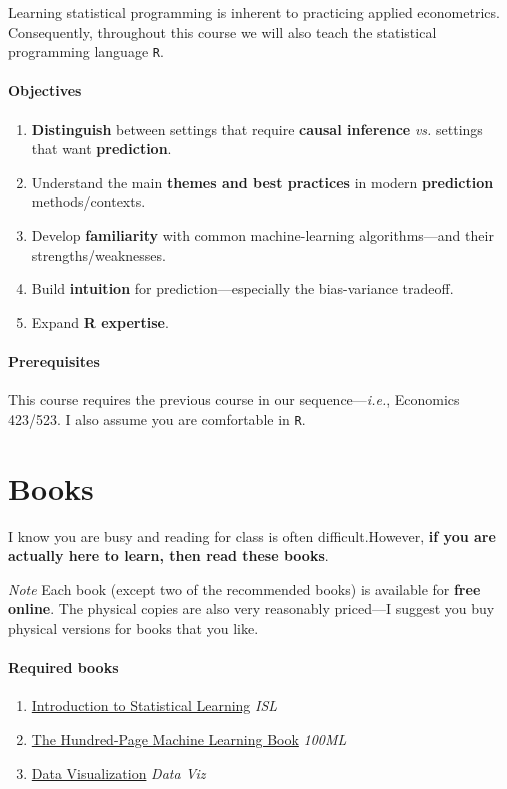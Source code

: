 \documentclass[10pt]{article}
\newcommand{\emf}[1]{\textbf{\textcolor{grass_green}{#1}}}
\begin{document}
Learning statistical programming is inherent to practicing applied econometrics. Consequently, throughout this course we will also teach the statistical programming language \texttt{R}.

\paragraph{Objectives}

\begin{enumerate}
  \item \emf{Distinguish} between settings that require \emf{causal inference} \textit{vs.} settings that want \emf{prediction}.
  \item Understand the main \emf{themes and best practices} in modern \emf{prediction} methods/contexts.
  \item Develop \emf{familiarity} with common machine-learning algorithms---and their strengths/weaknesses.
  \item Build \emf{intuition} for prediction---especially the bias-variance tradeoff.
  \item Expand \emf{R expertise}.
\end{enumerate}

\paragraph{Prerequisites} This course requires the previous course in our sequence---\textit{i.e.}, Economics 423/523. I also assume you are comfortable in \texttt{R}.

\section*{Books} I know you are busy and reading for class is often difficult.\newline However, \emf{if you are actually here to learn, then read these books}.

\bigskip

\noindent\textit{Note} Each book (except two of the recommended books) is available for \emf{free online}. The physical copies are also very reasonably priced---I suggest you buy physical versions for books that you like.

\paragraph{Required books}

\begin{enumerate}
\item \href{https://www.statlearning.com/}{Introduction to Statistical Learning} \textit{ISL}
\item \href{http://themlbook.com/}{The Hundred-Page Machine Learning Book} \textit{100ML}
\item \href{https://socviz.co/}{Data Visualization} \textit{Data Viz}
\end{enumerate}
\end{document}
